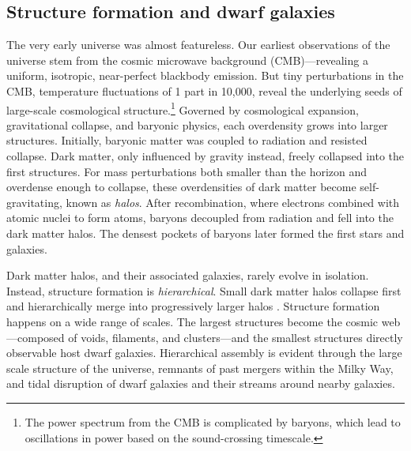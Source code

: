 \subsection{Structure formation and dwarf
galaxies}\label{structure-formation-and-dwarf-galaxies}

The very early universe was almost featureless. Our earliest
observations of the universe stem from the cosmic microwave background
(CMB)---revealing a uniform, isotropic, near-perfect blackbody emission.
But tiny perturbations in the CMB, temperature fluctuations of 1 part in
10,000, reveal the underlying seeds of large-scale cosmological
structure.\footnote{The power spectrum from the CMB is complicated by
  baryons, which lead to oscillations in power based on the
  sound-crossing timescale.} Governed by cosmological expansion,
gravitational collapse, and baryonic physics, each overdensity grows
into larger structures. Initially, baryonic matter was coupled to
radiation and resisted collapse. Dark matter, only influenced by gravity
instead, freely collapsed into the first structures. For mass
perturbations both smaller than the horizon and overdense enough to
collapse, these overdensities of dark matter become self-gravitating,
known as \emph{halos}. After recombination, where electrons combined
with atomic nuclei to form atoms, baryons decoupled from radiation and
fell into the dark matter halos. The densest pockets of baryons later
formed the first stars and galaxies.

Dark matter halos, and their associated galaxies, rarely evolve in
isolation. Instead, structure formation is \emph{hierarchical}. Small
dark matter halos collapse first and hierarchically merge into
progressively larger halos
\citep[e.g.,][]{blumenthal+1984, white+rees1978, white+frenk1991}.
Structure formation happens on a wide range of scales. The largest
structures become the cosmic web---composed of voids, filaments, and
clusters---and the smallest structures directly observable host dwarf
galaxies. Hierarchical assembly is evident through the large scale
structure of the universe, remnants of past mergers within the Milky
Way, and tidal disruption of dwarf galaxies and their streams around
nearby galaxies.

